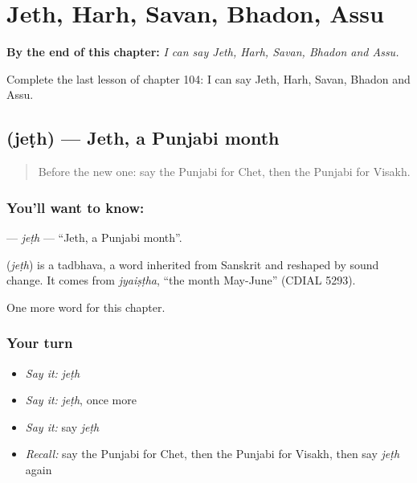 
\chapter{Jeth, Harh, Savan, Bhadon, Assu}
\label{ch:pa-jeth-harh-savan-bhadon-assu}

\begin{chapteropening}
\textbf{By the end of this chapter:} \emph{I can say Jeth, Harh, Savan, Bhadon and Assu.}

Complete the last lesson of chapter 104: I can say Jeth, Harh, Savan, Bhadon and Assu.
\end{chapteropening}

\section[\texorpdfstring{\pa{ਜੇਠ} (jeṭh)}{ਜੇਠ (jeṭh)}]{ (jeṭh) — Jeth, a Punjabi month}

\label{lesson:PA-C104-jeth}



\begin{quote}
Before the new one: say the Punjabi for Chet, then the Punjabi for Visakh.
\end{quote}

\subsection*{You'll want to know: }
\textbf{} — \emph{jeṭh} — \textquotedblleft{}Jeth, a Punjabi month\textquotedblright{}.

\begin{cousinweb}
\textbf{} (\emph{jeṭh}) is a tadbhava, a word inherited from Sanskrit and reshaped by sound change. It comes from \emph{jyaiṣṭha}, \textquotedblleft{}the month May-June\textquotedblright{} (CDIAL 5293).
\end{cousinweb}

\begin{grammarlens}[title={What you've built}]
One more word for this chapter.
\end{grammarlens}

\subsection*{Your turn}
\begin{itemize}
\raggedright
  \item \emph{Say it:} \emph{jeṭh}
  \item \emph{Say it:} \emph{jeṭh}, once more
  \item \emph{Say it:} say \emph{jeṭh}
  \item \emph{Recall:} say the Punjabi for Chet, then the Punjabi for Visakh, then say \emph{jeṭh} again
\end{itemize}

